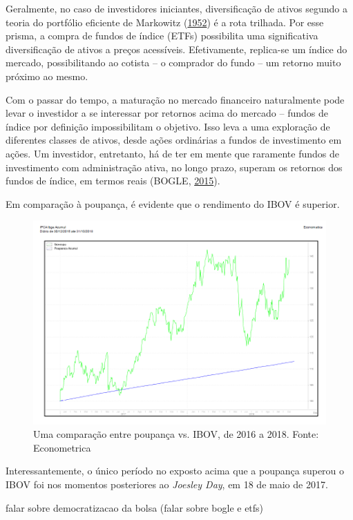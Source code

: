 \documentclass[grad,numbers]{coppe}
\begin{document}
  Geralmente, no caso de investidores iniciantes, diversificação de ativos segundo a teoria do portfólio eficiente de Markowitz (\protect\hyperlink{ref-markowitz1952}{1952}) é a rota trilhada. Por esse prisma, a compra de fundos de índice (ETFs) possibilita uma significativa diversificação de ativos a preços acessíveis. Efetivamente, replica-se um índice do mercado, possibilitando ao cotista -- o comprador do fundo -- um retorno muito próximo ao mesmo.
  
  Com o passar do tempo, a maturação no mercado financeiro naturalmente pode levar o investidor a se interessar por retornos acima do mercado -- fundos de índice por definição impossibilitam o objetivo. Isso leva a uma exploração de diferentes classes de ativos, desde ações ordinárias a fundos de investimento em ações. Um investidor, entretanto, há de ter em mente que raramente fundos de investimento com administração ativa, no longo prazo, superam os retornos dos fundos de índice, em termos reais (BOGLE, \protect\hyperlink{ref-bogle2015}{2015}).
  
  Em comparação à poupança, é evidente que o rendimento do IBOV é superior.
  \begin{figure}[H]
  \includegraphics[width=1\linewidth]{figure/poupanca-ou-acoes-grafico} \caption{Uma comparação entre poupança vs. IBOV, de 2016 a 2018. Fonte: Econometrica}\label{fig:ibovpoupanca}
  \end{figure}
  Interessantemente, o único período no exposto acima que a poupança superou o IBOV foi nos momentos posteriores ao \emph{Joesley Day}, em 18 de maio de 2017.
  
  falar sobre democratizacao da bolsa (falar sobre bogle e etfs)
  
\end{document}
